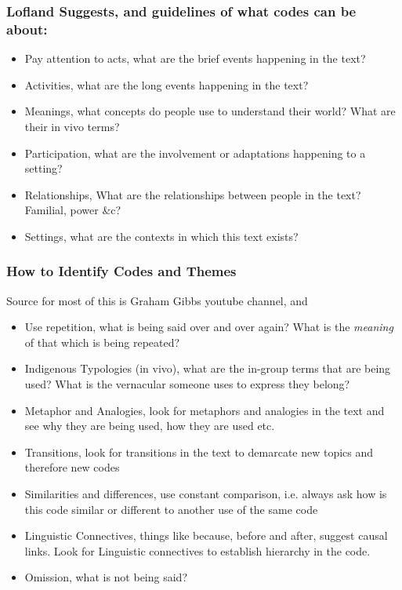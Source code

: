 \documentclass[10pt, letterpaper]{article}
\begin{document}
\subsubsection*{Lofland Suggests, and guidelines of what codes can be about:}
\label{sec:org25366e0}
\begin{itemize}
\item Pay attention to acts, what are the brief events happening in the text?
\item Activities, what are the long events happening in the text?
\item Meanings, what concepts do people use to understand their world? What are their in vivo terms?
\item Participation, what are the involvement or adaptations happening to a setting?
\item Relationships, What are the relationships between people in the text? Familial, power \&c?
\item Settings, what are the contexts in which this text exists?
\end{itemize}

\subsubsection*{How to Identify Codes and Themes}
\label{sec:orgf59d046}
Source for most of this is Graham Gibbs youtube channel, and \cite{doi:10.1177/1525822X02239569}
\begin{itemize}
\item Use repetition, what is being said over and over again? What is the \emph{meaning} of that which is being repeated?
\item Indigenous Typologies (in vivo), what are the in-group terms that are being used? What is the vernacular someone uses to express they belong?
\item Metaphor and Analogies, look for metaphors and analogies in the text and see why they are being used, how they are used etc.
\item Transitions, look for transitions in the text to demarcate new topics and therefore new codes
\item Similarities and differences, use constant comparison, i.e. always ask how is this code similar or different to another use of the same code
\item Linguistic Connectives, things like because, before and after, suggest causal links. Look for Linguistic connectives to establish hierarchy in the code.
\item Omission, what is not being said?
\end{itemize}
\end{document}
